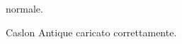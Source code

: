 \documentclass{article}
\begin{document}
normale.

{\caslon Caslon Antique caricato correttamente.}
\end{document}
